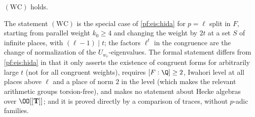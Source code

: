\begin{theorem}\label{pf:eis:wc}
$(\mathrm{WC})$ holds.
\end{theorem}

The statement $(\mathrm{WC})$ is the special case of \cref{pf:eis:hida} for $p=\ell$ split in $F$, starting from parallel weight $k_0\ge4$ and changing the
weight by $2t$ at a set $S$ of infinite places, with $(\ell-1)\mid t$; the factors $\ell^t$ in the congruence are the change of normalization of the
$U_{w_v}$-eigenvalues. The formal statement differs from \cref{pf:eis:hida} in that it only asserts the existence of congruent forms for
arbitrarily large $t$ (not for all congruent weights), requires $[F:\Q]\ge2$, Iwahori level at all places above $\ell$ and a place of norm $2$ in the level
(which makes the relevant arithmetic groups torsion-free), and makes no statement about Hecke algebras over $\OO[[\mathbf T]]$; and it is proved
directly by a comparison of traces, without $p$-adic families.

